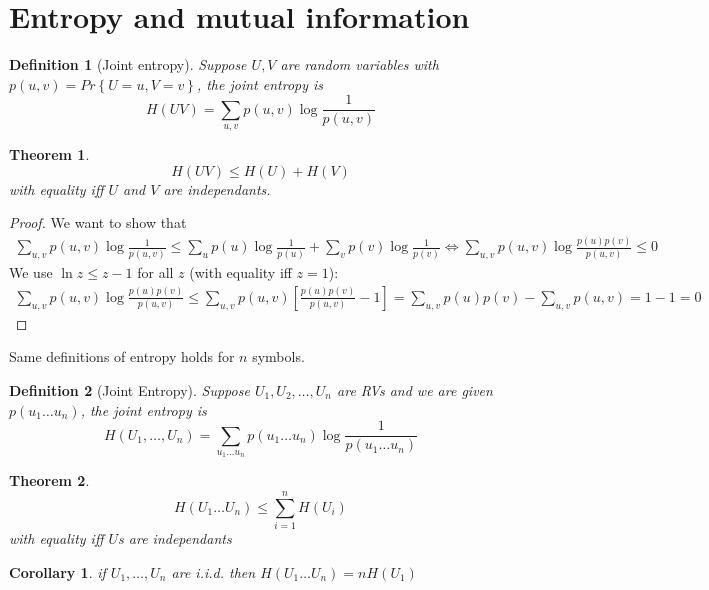 \documentclass{article}
\newtheorem{theorem}{Theorem}[section]
\newtheorem{corollary}{Corollary}[theorem]
\newtheorem{definition}{Definition}[section]
\theoremstyle{definition} %
\renewcommand{\Pr}[1]{Pr\left\{#1\right\}}
\begin{document}
\newpage
\section{Entropy and mutual information}
\label{sec:entropy}

\begin{definition}[Joint entropy]
  Suppose $U, V$ are random variables with $p(u,v) = \Pr{U=u, V=v}$, the joint entropy is
  \[
    H(UV) = \sum_{u,v} p(u,v) \log \frac 1 {p(u,v)}
  \]
\end{definition}

\begin{theorem}
  \[
    H(UV) \leq H(U) + H(V)
  \]
  with equality iff $U$ and $V$ are independants.
\end{theorem}

\begin{proof}
  We want to show that
  \begin{align*}
    \sum_{u,v} p(u,v) \log \frac 1 {p(u,v)} \leq \sum_u p(u) \log \frac 1 {p(u)} + \sum_v p(v) \log \frac 1 {p(v)}
    \iff \sum_{u,v} p(u,v) \log \frac {p(u)p(v)} {p(u,v)} \leq 0
  \end{align*}
  We use $\ln z \leq z - 1$ for all $z$ (with equality iff $z=1$):
  \begin{align*}
    \sum_{u,v} p(u,v) \log \frac {p(u)p(v)} {p(u,v)} \leq \sum_{u,v} p(u,v) \left[ \frac {p(u)p(v)} {p(u, v)} - 1 \right] = \sum_{u,v} p(u)p(v) - \sum_{u,v} p(u,v) = 1 - 1 = 0
  \end{align*}
\end{proof}

Same definitions of entropy holds for $n$ symbols.

\begin{definition}[Joint Entropy]
  Suppose $U_1, U_2, \dots, U_n$ are RVs and we are given $p(u_1 \dots u_n)$, the joint entropy is
  \[
    H(U_1, \dots, U_n) = \sum_{u_1 \dots u_n} p(u_1 \dots u_n) \log \frac 1 {p(u_1 \dots u_n)}
  \]
\end{definition}

\begin{theorem}
  \[
    H(U_1 \dots U_n) \leq \sum_{i=1}^n H(U_i)
  \]
  with equality iff $U$s are independants
\end{theorem}

\begin{corollary}
  if $U_1, \dots, U_n$ are i.i.d. then $H(U_1 \dots U_n) = nH(U_1)$
\end{corollary}
\end{document}
